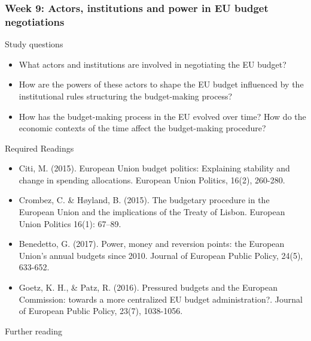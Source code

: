 \subsubsection*{Week 9: Actors, institutions and power in EU budget negotiations}

Study questions

\begin{itemize}
	\item What actors and institutions are involved in negotiating the EU budget?
	\item How are the powers of these actors to shape the EU budget influenced by the institutional rules structuring the budget-making process?
	\item How has the budget-making process in the EU evolved over time? How do the economic contexts of the time affect the budget-making procedure?
\end{itemize}

\noindent Required Readings

\begin{itemize}
	\item Citi, M. (2015). European Union budget politics: Explaining stability and change in spending allocations. European Union Politics, 16(2), 260-280.
	\item Crombez, C. \& Høyland, B. (2015). The budgetary procedure in the European Union and the implications of the Treaty of Lisbon. European Union Politics 16(1): 67–89.
	\item Benedetto, G. (2017). Power, money and reversion points: the European Union's annual budgets since 2010. Journal of European Public Policy, 24(5), 633-652.
	\item Goetz, K. H., \& Patz, R. (2016). Pressured budgets and the European Commission: towards a more centralized EU budget administration?. Journal of European Public Policy, 23(7), 1038-1056.
\end{itemize}

\noindent Further reading

